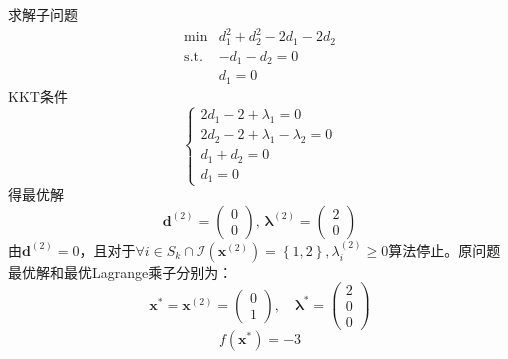 \begin{example}
\begin{solution}
        求解子问题
        \[
            \begin{array}{rl}
                \operatorname*{min}&d_{1}^{2}+d_{2}^{2}-2d_{1}-2d_{2}\\
                \mathrm{s.t.}&-d_{1}-d_2=0\\
                &d_1 = 0
            \end{array}
        \]
        KKT条件
        \[
            \left\{
                \begin{array}{l}
                    2d_1-2+\lambda_1 = 0\\
                    2d_2-2+\lambda_1-\lambda_2 = 0\\
                    d_1+d_2 = 0\\
                    d_1 = 0
                \end{array}
            \right.
        \]
        得最优解
        \[
            \boldsymbol{d}^{(2)}=\begin{pmatrix}0\\0\end{pmatrix},\,\boldsymbol{\lambda}^{(2)}=\begin{pmatrix}2\\0\end{pmatrix}
        \] 
        由$\boldsymbol{d}^{(2)}=0$，且对于$\forall i\in S_{k}\cap \mathcal{I}(\boldsymbol{x}^{(2)}) = \left\{ 1,2 \right\},\lambda_{i}^{(2)}\geqslant 0$算法停止。原问题最优解和最优Lagrange乘子分别为：
        \[
            \boldsymbol{x}^*=\boldsymbol{x}^{(2)}=\begin{pmatrix}0\\1\end{pmatrix},\quad 
            \boldsymbol{\lambda}^* = \begin{pmatrix}
                2\\0\\0
            \end{pmatrix}
        \]
        \[
            f(\boldsymbol{x}^{*}) = -3
        \]
    \end{solution}
\end{example}